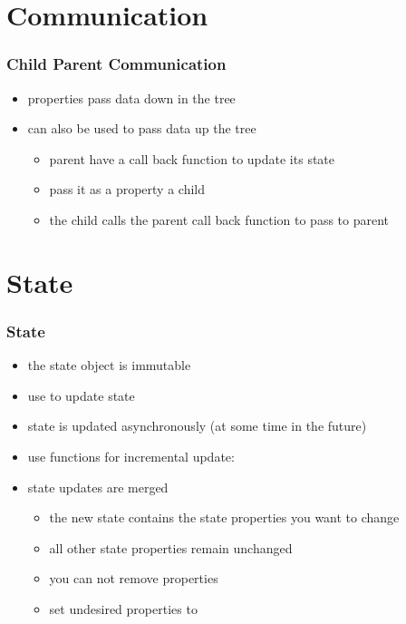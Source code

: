 \section{Communication}
\begin{frame}[fragile] \frametitle{Child Parent Communication}
\begin{itemize}
  \item properties pass data down in the tree
  \item can also be used to pass data up the tree
  \begin{itemize}
    \item parent have a call back function to update its state
    \item pass it as a property a child
    \item the child calls the parent call back function to pass to parent
  \end{itemize}
\end{itemize}
\end{frame}

\section{State}
\begin{frame}[fragile] \frametitle{State}
\begin{itemize}
  \item the state object is immutable
  \item use  to update state
  \item state is updated asynchronously (at some time in the future)
  \item use functions for incremental update: 
  \item state updates are merged
  \begin{itemize}
    \item the new state contains the state properties you want to change
    \item all other state properties remain unchanged
    \item you can not remove properties
    \item set undesired properties to 
  \end{itemize}
\end{itemize}
\end{frame}

